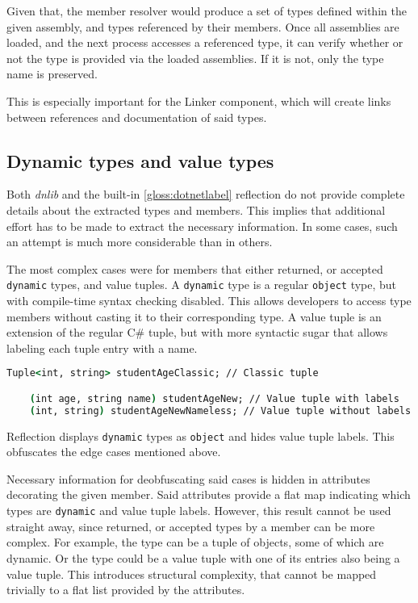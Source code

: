 Given that, the member resolver would produce a set of types defined within the given assembly, and types referenced by their members. Once all assemblies are loaded, and the next process accesses a referenced type, it can verify whether or not the type is provided via the loaded assemblies. If it is not, only the type name is preserved.

This is especially important for the Linker component, which will create links between references and documentation of said types.

\subsection{Dynamic types and value types}

Both \textit{dnlib} and the built-in \ref{gloss:dotnetlabel} reflection do not provide complete details about the extracted types and members. This implies that additional effort has to be made to extract the necessary information. In some cases, such an attempt is much more considerable than in others.

The most complex cases were for members that either returned, or accepted \lstinline[language=csh]{dynamic} types, and value tuples. A \lstinline[language=csh]{dynamic} type is a regular \lstinline[language=csh]{object} type, but with compile-time syntax checking disabled. This allows developers to access type members without casting it to their corresponding type. A value tuple is an extension of the regular C\# tuple, but with more syntactic sugar that allows labeling each tuple entry with a name.

\begin{lstlisting}[language=csh]
    Tuple<int, string> studentAgeClassic; // Classic tuple

    (int age, string name) studentAgeNew; // Value tuple with labels
    (int, string) studentAgeNewNameless; // Value tuple without labels
\end{lstlisting}

Reflection displays \lstinline[language=csh]{dynamic} types as \lstinline[language=csh]{object} and hides value tuple labels. This obfuscates the edge cases mentioned above.

Necessary information for deobfuscating said cases is hidden in attributes decorating the given member. Said attributes provide a flat map indicating which types are \lstinline[language=csh]{dynamic} and value tuple labels. However, this result cannot be used straight away, since returned, or accepted types by a member can be more complex. For example, the type can be a tuple of objects, some of which are dynamic. Or the type could be a value tuple with one of its entries also being a value tuple. This introduces structural complexity, that cannot be mapped trivially to a flat list provided by the attributes.

